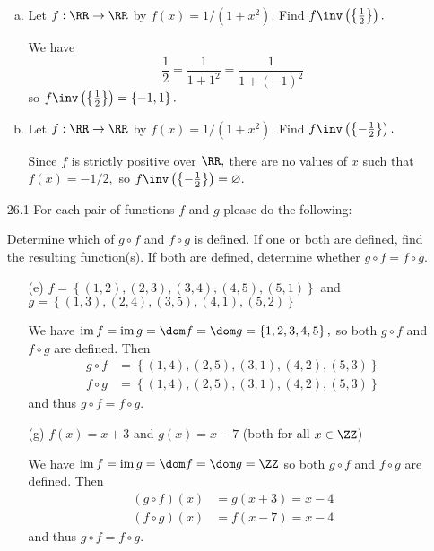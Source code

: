\documentclass{article}
\DeclareMathOperator{\ima}{im}
\begin{document}
\begin{itemize}
\begin{enumerate}[(a)]
			\item Let $f:\RR\to\RR$ by $f(x)=1/(1+x^2).$ Find $f\inv\left( \left\{ \frac{1}{2} \right\} \right).$
				\begin{answer*}
					We have
					\[\frac{1}{2} = \frac{1}{1+1^2} = \frac{1}{1+(-1)^2}\]
					so $f\inv\left( \left\{ \frac{1}{2} \right\} \right) = \left\{ -1, 1 \right\}.$
				\end{answer*}

			\item Let $f:\RR\to\RR$ by $f(x)=1/(1+x^2).$ Find $f\inv\left( \left\{ -\frac{1}{2} \right\} \right).$
				\begin{answer*}
					Since $f$ is strictly positive over $\RR,$ there are no values of $x$ such that $f(x)=-1/2,$ so $f\inv\left( \left\{ -\frac{1}{2} \right\} \right)=\varnothing.$
				\end{answer*}
				
		\end{enumerate}

	\item[26.1] For each pair of functions $f$ and $g$ please do the following:
		\begin{itemize}
			\ii Determine which of $g\circ f$ and $f\circ g$ is defined.
			\ii If one or both are defined, find the resulting function(s).
			\ii If both are defined, determine whether $g\circ f=f\circ g.$
		\end{itemize}
		\begin{itemize}
			\item[(e)] $f=\left\{ (1, 2), (2,  3), (3, 4), (4, 5), (5, 1) \right\}$ and $g=\left\{ (1, 3), (2, 4), (3, 5), (4, 1), (5, 2) \right\}$
				\begin{soln}
					We have $\ima f = \ima g = \dom f = \dom g = \left\{ 1, 2, 3, 4, 5 \right\},$ so both $g\circ f$ and $f\circ g$ are defined. Then
					\begin{align*}
						g\circ f &= \left\{ (1 ,4), (2, 5), (3, 1), (4, 2), (5, 3) \right\} \\
						f\circ g &= \left\{ (1, 4), (2, 5), (3, 1), (4, 2), (5, 3) \right\}
					\end{align*}
					and thus $g\circ f = f\circ g.$
				\end{soln}

			\item[(g)] $f(x)=x+3$ and $g(x)=x-7$ (both for all $x\in\ZZ$)
				\begin{soln}
					We have $\ima f=\ima g=\dom f=\dom g=\ZZ$ so both $g\circ f$ and $f\circ g$ are defined. Then
					\begin{align*}
						(g\circ f)(x) &= g(x+3) = x-4 \\
						(f\circ g)(x) &= f(x-7) = x-4
					\end{align*}
					and thus $g\circ f = f\circ g.$
				\end{soln}


\end{itemize}
\end{itemize}
\end{document}
